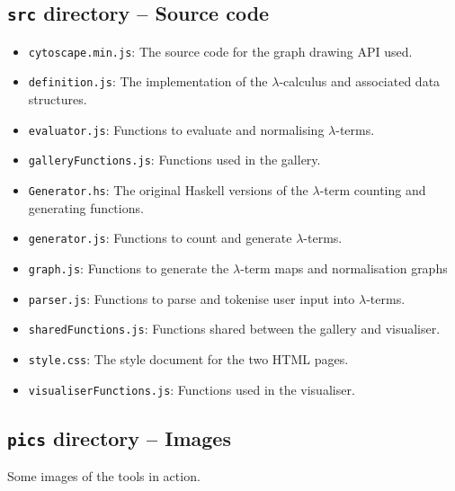 \documentclass[11pt]{article}
\begin{document}
\subsection{\texttt{src} directory -- Source code}
\begin{itemize}
    \item \texttt{cytoscape.min.js}: The source code for the graph drawing API used.
    \item \texttt{definition.js}: The implementation of the $\lambda$-calculus and associated data structures.
    \item \texttt{evaluator.js}: Functions to evaluate and normalising $\lambda$-terms.
    \item \texttt{galleryFunctions.js}: Functions used in the gallery.
    \item \texttt{Generator.hs}: The original Haskell versions of the $\lambda$-term counting and generating functions.
    \item \texttt{generator.js}: Functions to count and generate $\lambda$-terms.
    \item \texttt{graph.js}: Functions to generate the $\lambda$-term maps and normalisation graphs
    \item \texttt{parser.js}: Functions to parse and tokenise user input into $\lambda$-terms.
    \item \texttt{sharedFunctions.js}: Functions shared between the gallery and visualiser.
    \item \texttt{style.css}: The style document for the two HTML pages.
    \item \texttt{visualiserFunctions.js}: Functions used in the visualiser.
\end{itemize}

\subsection{\texttt{pics} directory -- Images}
Some images of the tools in action.
\end{document}
